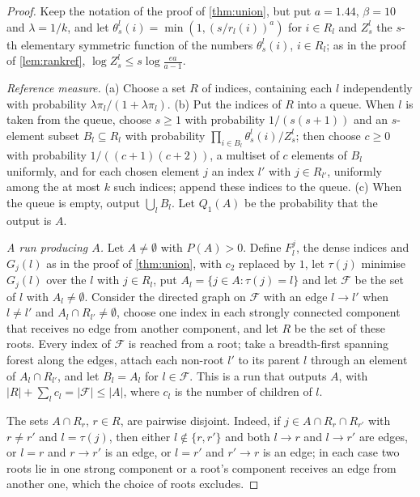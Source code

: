 \documentclass[11pt]{amsart}
\theoremstyle{definition}
\theoremstyle{remark}
\begin{document}
\begin{proof}
Keep the notation of the proof of \cref{thm:union}, but put $a=1.44$, $\beta=10$ and $\lambda=1/k$, and let
$\theta^l_s(i)=\min(1,(s/r_l(i))^a)$ for $i\in R_l$ and $Z^l_s$ the $s$-th elementary symmetric function of the numbers
$\theta^l_s(i)$, $i\in R_l$; as in the proof of \cref{lem:rankref}, $\log Z^l_s\le s\log\frac{ea}{a-1}$.

\emph{Reference measure.} (a) Choose a set $R$ of indices, containing each $l$ independently with probability
$\lambda\pi_l/(1+\lambda\pi_l)$. (b) Put the indices of $R$ into a queue. When $l$ is taken from the queue, choose
$s\ge1$ with probability $1/(s(s+1))$ and an $s$-element subset $B_l\subseteq R_l$ with probability
$\prod_{i\in B_l}\theta^l_s(i)/Z^l_s$; then choose $c\ge0$ with probability $1/((c+1)(c+2))$, a multiset of $c$
elements of $B_l$ uniformly, and for each chosen element $j$ an index $l'$ with $j\in R_{l'}$, uniformly among the at
most $k$ such indices; append these indices to the queue. (c) When the queue is empty, output $\bigcup_lB_l$. Let
$Q_1(A)$ be the probability that the output is $A$.

\emph{A run producing $A$.} Let $A\ne\emptyset$ with $P(A)>0$. Define $F^j_l$, the dense indices and $G_j(l)$ as in the
proof of \cref{thm:union}, with $c_2$ replaced by $1$, let $\tau(j)$ minimise $G_j(l)$ over the $l$ with $j\in R_l$,
put $A_l=\{j\in A:\tau(j)=l\}$ and let $\mathcal F$ be the set of $l$ with $A_l\ne\emptyset$. Consider the directed
graph on $\mathcal F$ with an edge $l\to l'$ when $l\ne l'$ and $A_l\cap R_{l'}\ne\emptyset$, choose one index in each
strongly connected component that receives no edge from another component, and let $R$ be the set of these roots.
Every index of $\mathcal F$ is reached from a root; take a breadth-first spanning forest along the edges, attach each
non-root $l'$ to its parent $l$ through an element of $A_l\cap R_{l'}$, and let $B_l=A_l$ for $l\in\mathcal F$. This is
a run that outputs $A$, with $|R|+\sum_lc_l=|\mathcal F|\le|A|$, where $c_l$ is the number of children of $l$.

The sets $A\cap R_r$, $r\in R$, are pairwise disjoint. Indeed, if $j\in A\cap R_r\cap R_{r'}$ with $r\ne r'$ and
$l=\tau(j)$, then either $l\notin\{r,r'\}$ and both $l\to r$ and $l\to r'$ are edges, or $l=r$ and $r\to r'$ is an
edge, or $l=r'$ and $r'\to r$ is an edge; in each case two roots lie in one strong component or a root's component
receives an edge from another one, which the choice of roots excludes.


\end{proof}
\end{document}
